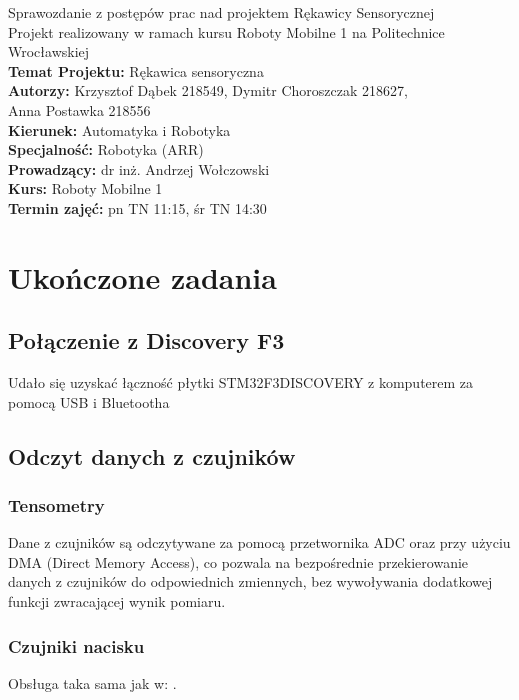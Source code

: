 \documentclass[12pt,a4paper]{article}
\begin{document}
\LARGE\centering Sprawozdanie z postępów prac nad projektem Rękawicy Sensorycznej\\
\large\centering Projekt realizowany w ramach kursu Roboty Mobilne 1 na Politechnice Wrocławskiej\\
\vspace{5 mm}
\normalsize\flushleft\textbf{Temat Projektu:} Rękawica sensoryczna\\
\textbf{Autorzy:} Krzysztof Dąbek 218549, Dymitr Choroszczak 218627,\\Anna Postawka 218556\\
\textbf{Kierunek:} Automatyka i Robotyka\\
\textbf{Specjalność:} Robotyka (ARR)\\
\textbf{Prowadzący:} dr inż. Andrzej Wołczowski\\
\textbf{Kurs:} Roboty Mobilne 1\\
\textbf{Termin zajęć:} pn TN 11:15, śr TN 14:30\\
\vspace{5 mm}
\section{Ukończone zadania}
\subsection{Połączenie z Discovery F3}
Udało się uzyskać łączność płytki STM32F3DISCOVERY z komputerem za pomocą USB i Bluetootha %

\subsection{Odczyt danych z czujników}
\subsubsection{Tensometry} \label{tensometry}
Dane z czujników są odczytywane za pomocą przetwornika ADC oraz przy użyciu DMA (Direct Memory Access), co pozwala na bezpośrednie przekierowanie danych z czujników do odpowiednich zmiennych, bez wywoływania dodatkowej funkcji zwracającej wynik pomiaru.
\subsubsection{Czujniki nacisku}
Obsługa taka sama jak w: .
\end{document}

